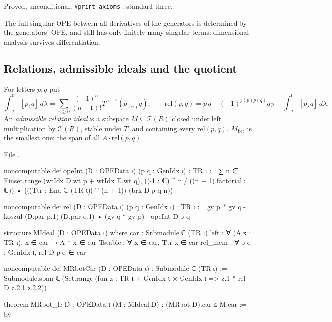 \begin{status}
Proved, unconditional; \texttt{\#print axioms} \allowbreak{}\allowbreak{}\allowbreak{}\allowbreak{}: standard three.
\end{status}

\begin{physics}
The full singular OPE between all derivatives of the generators is determined by the generators' OPE, and still has only
finitely many singular terms: dimensional analysis survives differentiation.
\end{physics}

\subsection{Relations, admissible ideals and the quotient}

\begin{definition}\label{l11:def:rel}
For letters $p,q$ put
\begin{equation*}
\textstyle\int_{-T}^0[p_\lambda q]\,d\lambda = \sum_{n\ge0}\frac{(-1)^n}{(n+1)!}T^{n+1}(p_{(n)}q),\qquad
\mathrm{rel}(p,q) = p\,q - (-1)^{p(p)p(q)}q\,p - \int_{-T}^0[p_\lambda q]\,d\lambda .
\end{equation*}
An \emph{admissible relation ideal} is a subspace $M\subseteq\mathcal T(R)$ closed under left multiplication by $\mathcal T(R)$,
stable under $T$, and containing every $\mathrm{rel}(p,q)$. $M_{\mathrm{bot}}$ is the smallest one: the span of all
$A\cdot\mathrm{rel}(p,q)$.
\end{definition}
\noindent File .
\begin{leancode}
noncomputable def opeInt (D : OPEData ι) (p q : GenIdx ι) : TR ι :=
  ∑ n ∈ Finset.range (wtIdx D.wt p + wtIdx D.wt q),
    ((-1 : ℂ) ^ n / ((n + 1).factorial : ℂ)) •
      (((Ttr : End ℂ (TR ι)) ^ (n + 1)) (brk D p q n))

noncomputable def rel (D : OPEData ι) (p q : GenIdx ι) : TR ι :=
  gv p * gv q - koszul (D.par p.1) (D.par q.1) • (gv q * gv p) - opeInt D p q

structure MIdeal (D : OPEData ι) where
  car : Submodule ℂ (TR ι)
  left : ∀ (A x : TR ι), x ∈ car → A * x ∈ car
  Tstable : ∀ x ∈ car, Ttr x ∈ car
  rel_mem : ∀ p q : GenIdx ι, rel D p q ∈ car

noncomputable def MRbotCar (D : OPEData ι) : Submodule ℂ (TR ι) :=
  Submodule.span ℂ (Set.range (fun z : TR ι × GenIdx ι × GenIdx ι => z.1 * rel D z.2.1 z.2.2))

theorem MRbot_le {D : OPEData ι} (M : MIdeal D) : (MRbot D).car ≤ M.car := by
\end{leancode}

